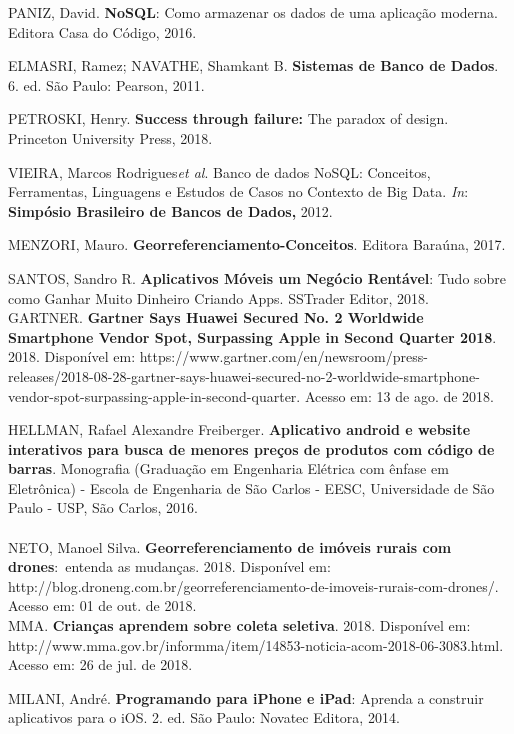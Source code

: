 PANIZ, David. \textbf{NoSQL}: Como armazenar os dados de uma aplicação moderna. Editora Casa
do Código, 2016.


ELMASRI, Ramez; NAVATHE, Shamkant B. \textbf{Sistemas de Banco de Dados}. 6. ed. São Paulo:
Pearson, 2011.


PETROSKI, Henry. \textbf{Success through failure:} The paradox of design. Princeton University
Press, 2018.


VIEIRA, Marcos Rodrigues\tab  \textit{et al}. Banco de dados NoSQL:\textbf{ }Conceitos,
Ferramentas, Linguagens e Estudos de Casos no Contexto de Big Data. \textit{In}:
\textbf{Simpósio Brasileiro de Bancos de Dados,} 2012.


MENZORI, Mauro. \textbf{Georreferenciamento-Conceitos}. Editora Baraúna, 2017.


SANTOS, Sandro R. \textbf{Aplicativos Móveis um Negócio Rentável}: Tudo sobre como Ganhar
Muito Dinheiro Criando Apps. SSTrader Editor, 2018.\\


GARTNER. \textbf{Gartner Says Huawei Secured No. 2 Worldwide Smartphone Vendor Spot,
Surpassing Apple in Second Quarter 2018}. 2018. Disponível em:
https://www.gartner.com/en/newsroom/press-releases/2018-08-28-gartner-says-huawei-secured-no-2-worldwide-smartphone-vendor-spot-surpassing-apple-in-second-quarter.
Acesso em: 13 de ago. de 2018.


HELLMAN, Rafael Alexandre Freiberger. \textbf{Aplicativo android e website interativos para
busca de menores preços de produtos com código de barras}. Monografia (Graduação em
Engenharia Elétrica com ênfase em Eletrônica) - Escola de Engenharia de São Carlos - EESC,
Universidade de São Paulo - USP, São Carlos, 2016. \\
 \\

NETO, Manoel Silva. \textbf{Georreferenciamento de imóveis rurais com drones}:\ entenda as
mudanças. 2018. Disponível em:
http://blog.droneng.com.br/georreferenciamento-de-imoveis-rurais-com-drones/.
Acesso em: 01 de out. de 2018.  \\


MMA. \textbf{Crianças aprendem sobre coleta seletiva}. 2018. Disponível em:
http://www.mma.gov.br/informma/item/14853-noticia-acom-2018-06-3083.html.
Acesso em: 26 de jul. de 2018.


MILANI, André. \textbf{Programando para iPhone e iPad}: Aprenda a construir aplicativos para
o iOS. 2. ed. São Paulo: Novatec Editora, 2014.


